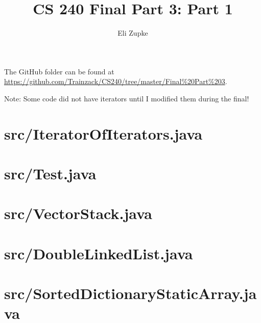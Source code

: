 \documentclass[letterpaper, 11pt]{article}
\title{CS 240 Final Part 3: Part 1}
\author{Eli Zupke}
\newcommand{\inputcode}[1]{
	
	\needspace{5em}
	\section{#1}
	
	\vspace{5em}
	\pagebreak[3]
	
}
\begin{document}
\maketitle

The GitHub folder can be found at \url{https://github.com/Trainzack/CS240/tree/master/Final%20Part%203}.

Note: Some code did not have iterators until I modified them during the final!
\tableofcontents
\inputcode{src/IteratorOfIterators.java}
\inputcode{src/Test.java}
\inputcode{src/VectorStack.java}
\inputcode{src/DoubleLinkedList.java}
\inputcode{src/SortedDictionaryStaticArray.java}
\end{document}
